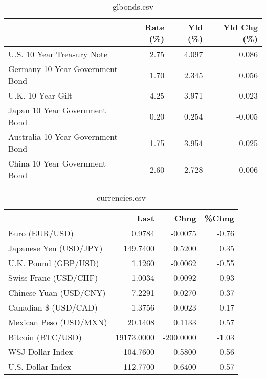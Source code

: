 \documentclass{article}%
\begin{document}
%


\begin{table}[htbp]%
\caption{glbonds.csv}%
\centering%
\begin{adjustbox}{width=1\textwidth}%
\begin{tabular}{lrrr}
\toprule
                                  &  Rate (\%) &  Yld (\%) &  Yld Chg (\%) \\
\midrule
       U.S. 10 Year Treasury Note &      2.75 &    4.097 &        0.086 \\
  Germany 10 Year Government Bond &      1.70 &    2.345 &        0.056 \\
                U.K. 10 Year Gilt &      4.25 &    3.971 &        0.023 \\
    Japan 10 Year Government Bond &      0.20 &    0.254 &       -0.005 \\
Australia 10 Year Government Bond &      1.75 &    3.954 &        0.025 \\
    China 10 Year Government Bond &      2.60 &    2.728 &        0.006 \\
\bottomrule
\end{tabular}
%
\end{adjustbox}%
\end{table}

%


\begin{table}[htbp]%
\caption{currencies.csv}%
\centering%
\begin{adjustbox}{width=1\textwidth}%
\begin{tabular}{lrrr}
\toprule
                       &       Last &      Chng &  \%Chng \\
\midrule
        Euro (EUR/USD) &     0.9784 &   -0.0075 &  -0.76 \\
Japanese Yen (USD/JPY) &   149.7400 &    0.5200 &   0.35 \\
  U.K. Pound (GBP/USD) &     1.1260 &   -0.0062 &  -0.55 \\
 Swiss Franc (USD/CHF) &     1.0034 &    0.0092 &   0.93 \\
Chinese Yuan (USD/CNY) &     7.2291 &    0.0270 &   0.37 \\
  Canadian \$ (USD/CAD) &     1.3756 &    0.0023 &   0.17 \\
Mexican Peso (USD/MXN) &    20.1408 &    0.1133 &   0.57 \\
     Bitcoin (BTC/USD) & 19173.0000 & -200.0000 &  -1.03 \\
      WSJ Dollar Index &   104.7600 &    0.5800 &   0.56 \\
     U.S. Dollar Index &   112.7700 &    0.6400 &   0.57 \\
\bottomrule
\end{tabular}
%
\end{adjustbox}%
\end{table}

%
\end{document}
